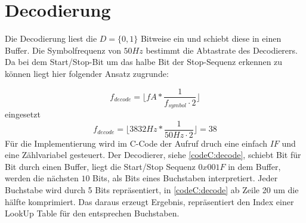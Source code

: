 \documentclass{article}
\begin{document}
\section{Decodierung}

Die Decodierung liest die $D = \{0,1\}$ Bitweise ein und schiebt diese in einen Buffer. 
Die Symbolfrequenz von $50Hz$ bestimmt die Abtastrate des Decodierers. Da bei dem Start/Stop-Bit um das
halbe Bit der Stop-Sequenz erkennen zu können liegt hier folgender Ansatz zugrunde:

$$
f_{decode} = \lfloor fA * \frac{1}{f_{symbol} \cdot 2}\rfloor 
$$
eingesetzt
$$
f_{decode} = \lfloor 3832Hz * \frac{1}{50Hz\cdot 2}\rfloor = 38
$$
Für die Implementierung wird im C-Code der Aufruf druch eine einfach $IF$ und eine Zählvariabel
gesteuert. Der Decodierer, siehe \ref{codeC:decode}, schiebt Bit für Bit durch einen Buffer, liegt
die Start/Stop Sequenz $0x001F$ in dem Buffer, werden die nächsten $10$ Bits, als Bits eines Buchstaben interpretiert.
Jeder Buchstabe wird durch 5 Bits repräsentiert, in \ref{codeC:decode} ab Zeile 20 um die hälfte komprimiert.
Das daraus erzeugt Ergebnis, repräsentiert den Index einer LookUp Table für den entsprechen Buchstaben.

%
%
%
%
%
\end{document}
